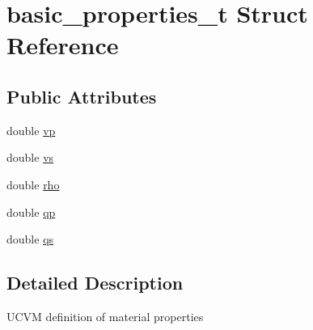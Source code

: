 \hypertarget{structbasic__properties__t}{\section{basic\+\_\+properties\+\_\+t Struct Reference}
\label{structbasic__properties__t}
}
\subsection*{Public Attributes}
\begin{DoxyCompactItemize}
\item 
double \hyperlink{structbasic__properties__t_a5162d2a7d7f991c1a67a94abf947b054}{vp}
\item 
double \hyperlink{structbasic__properties__t_a8856e1899a2cab207b667d7f1300ab84}{vs}
\item 
double \hyperlink{structbasic__properties__t_a0a1c90d22328a93da73bb44362667f84}{rho}
\item 
double \hyperlink{structbasic__properties__t_a054b74822167020ca2aed30f51950b11}{qp}
\item 
double \hyperlink{structbasic__properties__t_aab9070f4f1be66487a650dee9d1b1e81}{qs}
\end{DoxyCompactItemize}


\subsection{Detailed Description}
U\+C\+V\+M definition of material properties 

